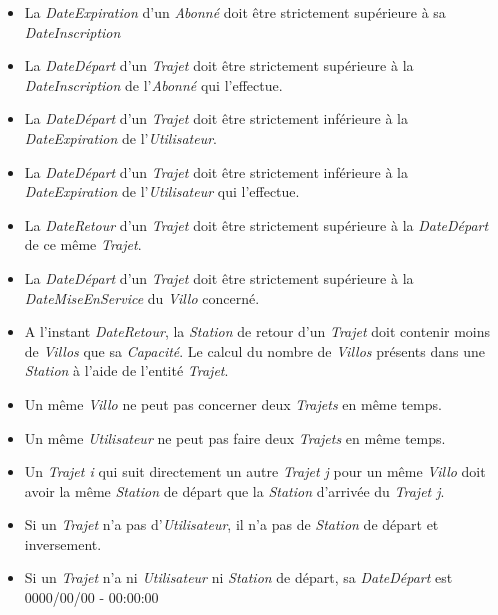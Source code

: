 \documentclass[a4paper, 12pt]{report}
\begin{document}
	\begin{itemize}
		\item La \textit{DateExpiration} d'un \textit{Abonné} doit être strictement supérieure à sa \textit{DateInscription}
		
		\item La \textit{DateDépart} d'un \textit{Trajet} doit être strictement supérieure à la \textit{DateInscription} de l'\textit{Abonné} qui l'effectue.
		
		\item La \textit{DateDépart} d'un \textit{Trajet} doit être strictement inférieure à la \textit{DateExpiration} de l'\textit{Utilisateur}.
		
		\item La \textit{DateDépart} d'un \textit{Trajet} doit être strictement inférieure à la \textit{DateExpiration} de l'\textit{Utilisateur} qui l'effectue.
		
		\item La \textit{DateRetour} d'un \textit{Trajet} doit être strictement supérieure à la \textit{DateDépart} de ce même \textit{Trajet}.
		
		\item La \textit{DateDépart} d'un \textit{Trajet} doit être strictement supérieure à la \textit{DateMiseEnService} du \textit{Villo} concerné.
		
		\item A l'instant \textit{DateRetour}, la \textit{Station} de retour d'un \textit{Trajet} doit contenir moins de \textit{Villos} que sa \textit{Capacité}. Le calcul du nombre de \textit{Villos} présents dans une \textit{Station} à l'aide de l'entité \textit{Trajet}.
		
		\item Un même \textit{Villo} ne peut pas concerner deux \textit{Trajets} en même temps.
		
		\item Un même \textit{Utilisateur} ne peut pas faire deux \textit{Trajets} en même temps.
		
		\item Un \textit{Trajet i} qui suit directement un autre \textit{Trajet j} pour un même \textit{Villo} doit avoir la même \textit{Station} de départ que la \textit{Station} d'arrivée du \textit{Trajet j}.
		
		\item Si un \textit{Trajet} n'a pas d'\textit{Utilisateur}, il n'a pas de \textit{Station} de départ et inversement.
		
		\item Si un \textit{Trajet} n'a ni \textit{Utilisateur} ni \textit{Station} de départ, sa \textit{DateDépart} est 0000/00/00 - 00:00:00
		

\end{itemize}
\end{document}
